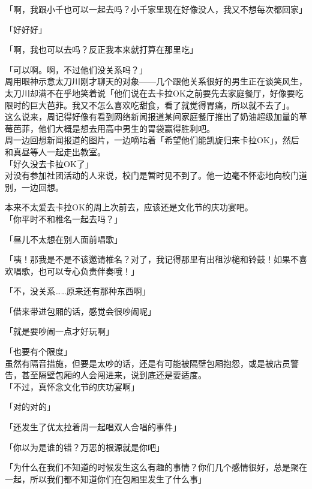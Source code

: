 「啊，我跟小千也可以一起去吗？小千家里现在好像没人，我又不想每次都回家」

「好好好」

「啊，我也可以去吗？反正我本来就打算在那里吃」

「可以啊。啊，不过他们没关系吗？」\\

周用眼神示意太刀川刚才聊天的对象——几个跟他关系很好的男生正在谈笑风生，太刀川却满不在乎地笑着说「他们说在去卡拉OK之前要先去家庭餐厅，好像要吃限时的巨大芭菲。我又不怎么喜欢吃甜食，看了就觉得胃痛，所以就不去了」。\\

这么说来，周记得好像有看到网络新闻报道某间家庭餐厅推出了奶油超级加量的草莓芭菲，他们大概是想去用高中男生的胃袋赢得胜利吧。\\

周一边回想新闻报道的图片，一边嘀咕着「希望他们能凯旋归来卡拉OK」，然后和真昼等人一起走出教室。\\

「好久没去卡拉OK了」\\

对没有参加社团活动的人来说，校门是暂时见不到了。他一边毫不怀恋地向校门道别，一边回想。

本来不太爱去卡拉OK的周上次前去，应该还是文化节的庆功宴吧。\\

「你平时不和椎名一起去吗？」

「昼儿不太想在别人面前唱歌」

「咦！那我是不是不该邀请椎名？对了，我记得那里有出租沙槌和铃鼓！如果不喜欢唱歌，也可以专心负责伴奏哦！」

「不，没关系……原来还有那种东西啊」

「借来带进包厢的话，感觉会很吵闹呢」

「就是要吵闹一点才好玩啊」

「也要有个限度」\\

虽然有隔音措施，但要是太吵的话，还是有可能被隔壁包厢抱怨，或是被店员警告，甚至隔壁包厢的人会闯进来，说到底还是要适度。\\

「不过，真怀念文化节的庆功宴啊」

「对的对的」

「还发生了优太拉着周一起唱双人合唱的事件」

「你以为是谁的错？万恶的根源就是你吧」

「为什么在我们不知道的时候发生这么有趣的事情？你们几个感情很好，总是聚在一起，所以我们都不知道你们在包厢里发生了什么事」\\

